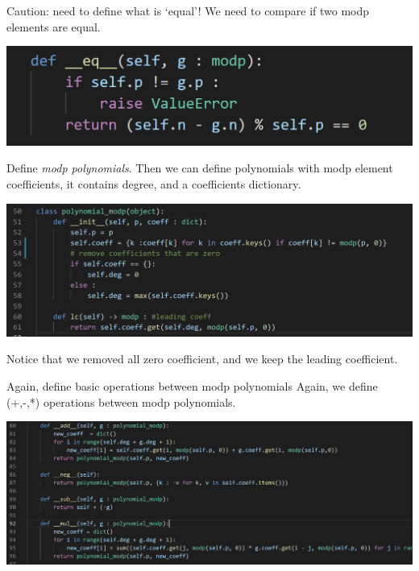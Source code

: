 \documentclass{beamer}
\begin{document}
\begin{frame}{Caution: need to define what is `equal'!}
    We need to compare if two modp elements are equal.
    \begin{center}
        \includegraphics[scale = .5]{modpequal.png}
    \end{center}
\end{frame}

\begin{frame}{Define \emph{modp polynomials}.}
    Then we can define polynomials with modp element coefficients,
    it contains degree, and a coefficients dictionary.
    \begin{center}
        \includegraphics[scale = .5]{modppoly.png}
    \end{center} 
    Notice that we removed all zero coefficient, and we keep the leading coefficient. 
\end{frame}

\begin{frame}{Again, define basic operations between modp polynomials}
    Again, we define (+,-,*) operations between modp polynomials.
    \begin{center}
        \includegraphics[scale = .5]{polyoperation.png}
    \end{center}
\end{frame}
\end{document}
